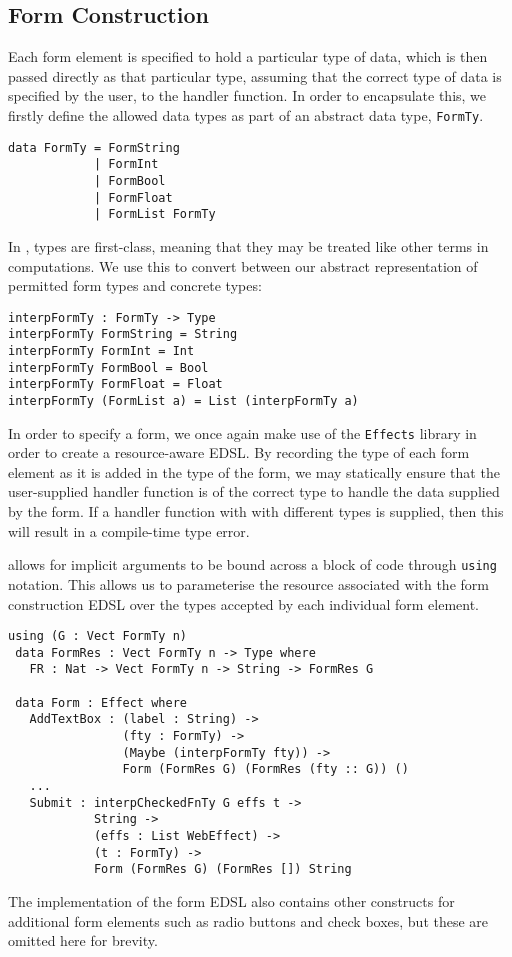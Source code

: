 \documentclass[preprint]{sigplanconf}
\begin{document}
\subsection{Form Construction}
Each form element is specified to hold a particular type of data, which is then passed directly as that particular type, assuming that the correct type of data is specified by the user, to the handler function. In order to encapsulate this, we firstly define the allowed data types as part of an abstract data type, \texttt{FormTy}.
\begin{verbatim}
data FormTy = FormString
            | FormInt
            | FormBool
            | FormFloat
            | FormList FormTy 
\end{verbatim}
In \idris{}, types are first-class, meaning that they may be treated like other terms in computations. We use this to convert between our abstract representation of permitted form types and concrete types:
\begin{verbatim}
interpFormTy : FormTy -> Type
interpFormTy FormString = String
interpFormTy FormInt = Int
interpFormTy FormBool = Bool
interpFormTy FormFloat = Float
interpFormTy (FormList a) = List (interpFormTy a)
\end{verbatim}
%
In order to specify a form, we once again make use of the \texttt{Effects} library in order to create a resource-aware EDSL. By recording the type of each form element as it is added in the type of the form, we may statically ensure that the user-supplied handler function is of the correct type to handle the data supplied by the form. If a handler function with with different types is supplied, then this will result in a compile-time type error.

\idris{} allows for implicit arguments to be bound across a block of code through \texttt{using} notation. This allows us to parameterise the resource associated with the form construction EDSL over the types accepted by each individual form element.

{\small
\begin{verbatim}
using (G : Vect FormTy n)
 data FormRes : Vect FormTy n -> Type where
   FR : Nat -> Vect FormTy n -> String -> FormRes G

 data Form : Effect where
   AddTextBox : (label : String) -> 
                (fty : FormTy) -> 
                (Maybe (interpFormTy fty)) -> 
                Form (FormRes G) (FormRes (fty :: G)) () 
   ...
   Submit : interpCheckedFnTy G effs t -> 
            String -> 
            (effs : List WebEffect) -> 
            (t : FormTy) -> 
            Form (FormRes G) (FormRes []) String
\end{verbatim}
}
The implementation of the form EDSL also contains other constructs for additional form elements such as radio buttons and check boxes, but these are omitted here for brevity.
\end{document}
